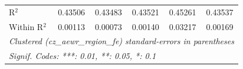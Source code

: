 \begin{tabular}{lccccc}
   R$^2$                                                        & 0.43506            & 0.43483         & 0.43521               & 0.45261                    & 0.43537\\  
   Within R$^2$                                                 & 0.00113            & 0.00073         & 0.00140               & 0.03217                    & 0.00169\\  
   \midrule \midrule
   \multicolumn{6}{l}{\emph{Clustered (cz\_aewr\_region\_fe) standard-errors in parentheses}}\\
   \multicolumn{6}{l}{\emph{Signif. Codes: ***: 0.01, **: 0.05, *: 0.1}}\\
\end{tabular}
\par\endgroup


